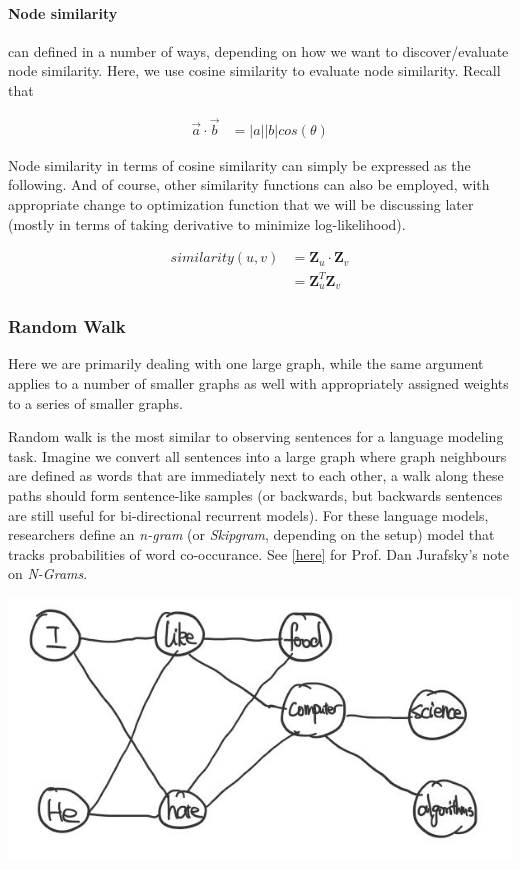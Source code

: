 \paragraph{Node similarity} can defined in a number of ways, depending on how we want to discover/evaluate node similarity. Here, we use cosine similarity to evaluate node similarity. Recall that

\begin{align}
    \vec{a} \cdot \vec{b} &= |a||b|cos(\theta)
\end{align}

Node similarity in terms of cosine similarity can simply be expressed as  the following. And of course, other similarity functions can also be employed, with appropriate change to optimization function that we will be discussing later (mostly in terms of taking derivative to minimize log-likelihood).

\begin{align}
    similarity (u, v) &= \mathbf{Z}_u \cdot \mathbf{Z}_v \\
                      &= \mathbf{Z}_u^T \mathbf{Z}_v
\end{align}{}

\subsubsection{Random Walk}

Here we are primarily dealing with one large graph, while the same argument applies to a number of smaller graphs as well with appropriately assigned weights to a series of smaller graphs.

Random walk is the most similar to observing sentences for a language modeling task. Imagine we convert all sentences into a large graph where graph neighbours are defined as words that are immediately next to each other, a walk along these paths should form sentence-like samples (or backwards, but backwards sentences are still useful for bi-directional recurrent models). For these language models, researchers define an \textit{n-gram} (or \textit{Skipgram}, depending on the setup) model that tracks probabilities of word co-occurance. See \href{https://web.stanford.edu/~jurafsky/slp3/3.pdf}{[here]} for Prof. Dan Jurafsky's note on \textit{N-Grams}.

{
\centering
\includegraphics[width=0.65\linewidth]{notes/img/n4_sentences.JPG} \par
}

